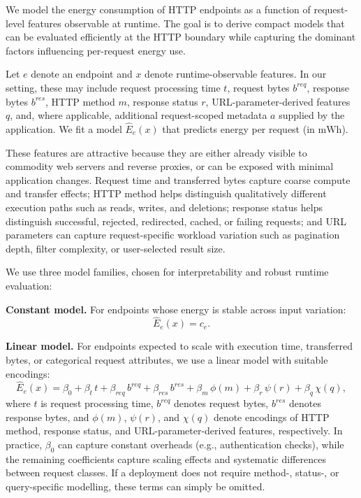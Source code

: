 We model the energy consumption of HTTP endpoints as a function of
request-level features observable at runtime. The goal is to derive compact
models that can be evaluated efficiently at the HTTP boundary while capturing
the dominant factors influencing per-request energy use.

Let \(e\) denote an endpoint and \(x\) denote runtime-observable features. In our setting, these may include request processing time \(t\), request bytes \(b^{req}\), response bytes \(b^{res}\), HTTP method \(m\), response status \(r\), URL-parameter-derived features \(q\), and, where applicable, additional request-scoped metadata \(a\) supplied by the application. We fit a model \(\widehat{E}_e(x)\) that predicts energy per request (in \(\mathrm{mWh}\)).

These features are attractive because they are either already visible to commodity web servers and reverse proxies, or can be exposed with minimal application changes. Request time and transferred bytes capture coarse compute and transfer effects; HTTP method helps distinguish qualitatively different execution paths such as reads, writes, and deletions; response status helps distinguish successful, rejected, redirected, cached, or failing requests; and URL parameters can capture request-specific workload variation such as pagination depth, filter complexity, or user-selected result size.

We use three model families, chosen for interpretability and robust runtime evaluation:

\textbf{Constant model.}
For endpoints whose energy is stable across input variation:
\[
\widehat{E}_e(x) = c_e.
\]

\textbf{Linear model.}
For endpoints expected to scale with execution time, transferred bytes, or categorical request attributes, we use a linear model with suitable encodings:
\[
\widehat{E}_e(x) =
\beta_0
+ \beta_t\, t
+ \beta_{req}\, b^{req}
+ \beta_{res}\, b^{res}
+ \beta_m\, \phi(m)
+ \beta_r\, \psi(r)
+ \beta_q\, \chi(q),
\]
where \(t\) is request processing time, \(b^{req}\) denotes request bytes, \(b^{res}\) denotes response bytes, and \(\phi(m)\), \(\psi(r)\), and \(\chi(q)\) denote encodings of HTTP method, response status, and URL-parameter-derived features, respectively. In practice, \(\beta_0\) can capture constant overheads (e.g., authentication checks), while the remaining coefficients capture scaling effects and systematic differences between request classes. If a deployment does not require method-, status-, or query-specific modelling, these terms can simply be omitted.

